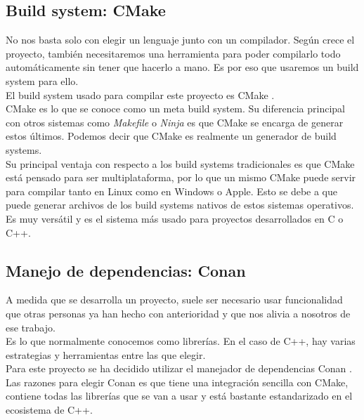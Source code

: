 \subsection{Build system: CMake}

No nos basta solo con elegir un lenguaje junto con un compilador. Según crece el proyecto, también necesitaremos una herramienta para poder compilarlo todo automáticamente sin tener que hacerlo a mano. Es por eso que usaremos un build system para ello.\\

El build system usado para compilar este proyecto es CMake \cite{cmake}.\\

CMake es lo que se conoce como un meta build system. Su diferencia principal con otros sistemas como \textit{Makefile} o \textit{Ninja} es que CMake se encarga de generar estos últimos. Podemos decir que CMake es realmente un generador de build systems.\\

Su principal ventaja con respecto a los build systems tradicionales es que CMake está pensado para ser multiplataforma, por lo que un mismo CMake puede servir para compilar tanto en Linux como en Windows o Apple. Esto se debe a que puede generar archivos de los build systems nativos de estos sistemas operativos.\\

Es muy versátil y es el sistema más usado para proyectos desarrollados en C o C++.

\subsection{Manejo de dependencias: Conan}

A medida que se desarrolla un proyecto, suele ser necesario usar funcionalidad que otras personas ya han hecho con anterioridad y que nos alivia a nosotros de ese trabajo.\\

Es lo que normalmente conocemos como librerías. En el caso de C++, hay varias estrategias y herramientas entre las que elegir.\\

Para este proyecto se ha decidido utilizar el manejador de dependencias Conan \cite{conan}.\\

Las razones para elegir Conan es que tiene una integración sencilla con CMake, contiene todas las librerías que se van a usar y está bastante estandarizado en el ecosistema de C++.\\

